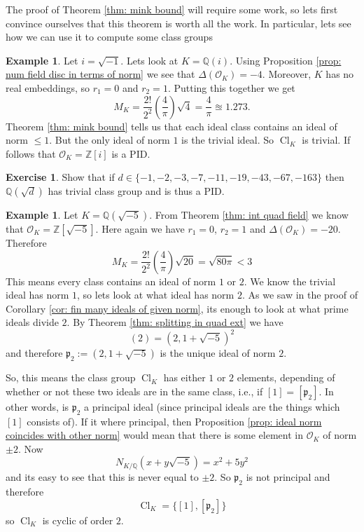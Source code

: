 \documentclass[11pt,a4paper]{report}
\theoremstyle{plain}
\theoremstyle{definition}
\newtheorem{exmp}[subsection]{Example}
\theoremstyle{definition}
\newtheorem{question}[subsection]{Exercise}
\newcommand{\ZZ}{\mathbb{Z}}
\def\QQ{\mathbb{Q}}
\def\gothp{\mathfrak{p}}
\def \OO {\mathcal{O}}
\DeclareMathOperator{\Cl}{Cl}
\begin{document}
The proof of Theorem \ref{thm: mink bound} will require some work, so lets first convince ourselves that this theorem is worth all the work. In particular, lets see how we can use it to compute some class groups

\begin{exmp}
	Let $i=\sqrt{-1}$. Lets look at $K=\QQ(i)$. Using Proposition \ref{prop: num field disc in terms of norm} we see that $\Delta(\OO_K)=-4$. Moreover, $K$ has no real embeddings, so $r_1=0$ and $r_2=1$. Putting this together we get \[M_K=\frac{2!}{2^2} \left(\frac{4}{\pi}\right)\sqrt{4}=\frac{4}{\pi} \approxeq 1.273.\] Theorem \ref{thm: mink bound} tells us that each ideal class contains an ideal of norm $\leq 1$. But the only ideal of norm $1$ is the trivial ideal. So $\Cl_K$ is trivial. If follows that $\OO_K=\ZZ[i]$ is a PID. 
\end{exmp}

\begin{question}
	Show that if $d \in \{-1,-2,-3,-7,-11,-19,-43,-67,-163\}$ then $\QQ(\sqrt{d})$ has trivial class group and is thus a PID.
\end{question}
\begin{exmp}\label{exmp: class group -5}
	Let $K=\QQ(\sqrt{-5})$. From  Theorem \ref{thm: int quad field} we know that $\OO_K=\ZZ[\sqrt{-5}]$. Here again we have $r_1=0$, $r_2=1$ and $\Delta(\OO_K)=-20$. Therefore  \[M_K=\frac{2!}{2^2} \left(\frac{4}{\pi}\right)\sqrt{20}=\sqrt{80 \pi}< 3\]
	This means every class contains an ideal of norm $1$ or $2$. We know the trivial ideal has norm $1$, so lets look at what ideal has norm $2$. As we saw in the proof of Corollary \ref{cor: fin many ideals of given norm}, its enough to look at what prime ideals divide $2$. By Theorem \ref{thm: splitting in quad ext} we have \[(2)=(2,1+\sqrt{-5})^2\] and therefore $\gothp_2:=(2,1+\sqrt{-5})$ is the unique ideal of norm $2$. 
	
	So, this means the class group $\Cl_K$ has either $1$ or $2$ elements, depending of whether or not these two ideals are in the same class, i.e., if $[1]=[\gothp_2]$. In other words, is $\gothp_2$ a principal ideal (since principal ideals are the things which $[1]$ consists of). If it where principal, then Proposition \ref{prop: ideal norm coincides with other norm} would mean that there is some element in $\OO_K$ of norm $\pm 2$. Now \[N_{K/\QQ}(x+y\sqrt{-5})=x^2+5y^2\] and its easy to see that this is never equal to $\pm 2$. So $\gothp_2$ is not principal and therefore \[\Cl_K=\{[1],[\gothp_2]\}\] so $\Cl_K$ is cyclic of order $2$.	
\end{exmp}
\end{document}
